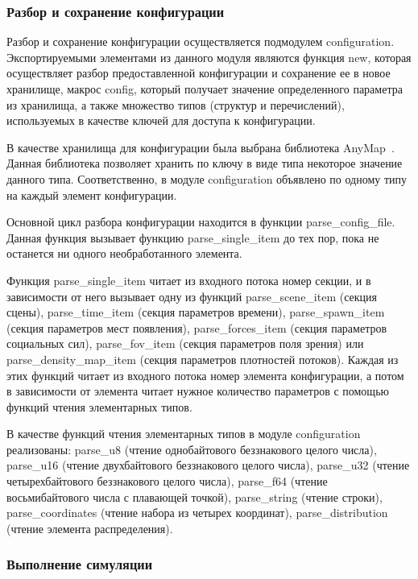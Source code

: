 \subsubsection{Разбор и сохранение конфигурации}
\label{sec:development:core:configuration}

Разбор и сохранение конфигурации осуществляется подмодулем con\-fi\-gu\-ra\-ti\-on.
Экспортируемыми элементами из данного модуля являются
функция new, которая осуществляет разбор предоставленной конфигурации и сохранение ее в новое хранилище,
макрос config, который получает значение определенного параметра из хранилища,
а также множество типов (структур и перечислений), используемых в качестве ключей для доступа к конфигурации.

В качестве хранилища для конфигурации была выбрана библиотека AnyMap~\cite{rust_anymap_cargo}.
Данная библиотека позволяет хранить по ключу в виде типа некоторое значение данного типа.
Соответственно, в модуле configuration объявлено по одному типу на каждый элемент конфигурации.

Основной цикл разбора конфигурации находится в функции par\-se\_con\-fig\_fi\-le.
Данная функция вызывает функцию par\-se\_sin\-gle\_item до тех пор, пока не останется ни одного необработанного элемента.

Функция parse\_single\_item читает из входного потока номер секции, и в зависимости от него вызывает одну из функций
par\-se\_sce\-ne\_item (секция сцены), par\-se\_time\_item (секция параметров времени),
par\-se\_spawn\_item (секция параметров мест появления),
par\-se\_for\-ces\_item (секция параметров социальных сил),
par\-se\_fov\_item (секция параметров поля зрения)
или par\-se\_den\-si\-ty\_map\_item (секция параметров плотностей потоков).
Каждая из этих функций читает из входного потока номер элемента конфигурации,
а потом в зависимости от элемента читает нужное количество параметров с помощью функций чтения элементарных типов.

В качестве функций чтения элементарных типов в модуле configuration реализованы:
par\-se\_u8 (чтение однобайтового беззнакового целого числа),
par\-se\_u16 (чтение двухбайтового беззнакового целого числа),
par\-se\_u32 (чтение четырехбайтового беззнакового целого числа),
par\-se\_f64 (чтение восьмибайтового числа с плавающей точкой),
par\-se\_string (чтение строки),
par\-se\_co\-or\-di\-na\-tes (чтение набора из четырех координат),
par\-se\_dis\-tri\-bu\-ti\-on (чтение элемента распределения).

\subsubsection{Выполнение симуляции}
\label{sec:development:core:simulation}

